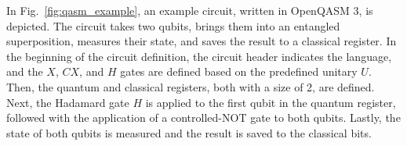 In Fig.~\ref{fig:qasm_example}, an example circuit, written in OpenQASM 3, is depicted. The circuit takes two qubits, brings them into an entangled superposition, measures their state, and saves the result to a classical register. In the beginning of the circuit definition, the circuit header indicates the language, and the $X$, $CX$, and $H$ gates are defined based on the predefined unitary $U$. Then, the quantum and classical registers, both with a size of 2, are defined. Next, the Hadamard gate $H$ is applied to the first qubit in the quantum register, followed with the application of a controlled-NOT gate to both qubits. Lastly, the state of both qubits is measured and the result is saved to the classical bits.